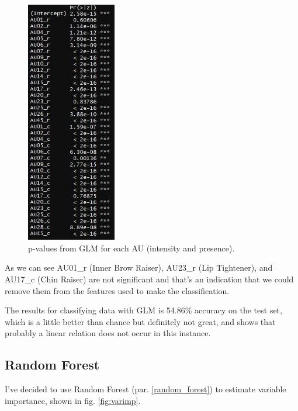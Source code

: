 \begin{figure}[H]
	\centering
	\includegraphics[width=0.35\textwidth]{images/pval}
	\caption{p-values from GLM for each AU (intensity and presence).}
	\label{fig:pval}
\end{figure}

As we can see AU01\_r (Inner Brow Raiser), AU23\_r (Lip Tightener), and AU17\_c (Chin Raiser) are not significant and that's an indication that we could remove them from the features used to make the classification.

The results for classifying data with GLM is 54.86\% accuracy on the test set, which is a little better than chance but definitely not great, and shows that probably a linear relation does not occur in this instance. 

\clearpage

\subsection{Random Forest} \label{rf}
I've decided to use Random Forest (par. \ref{random_forest}) to estimate variable importance, shown in fig. \ref{fig:varimp}.

